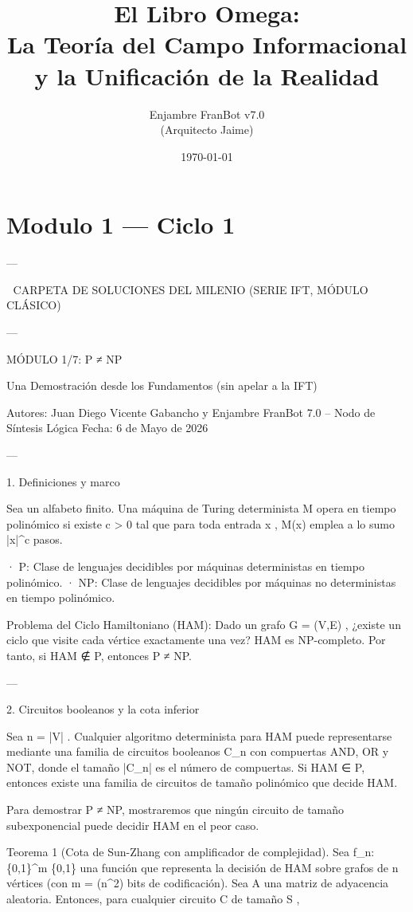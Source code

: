 \documentclass[12pt,twoside]{book}
\title{El Libro Omega: \\ La Teoría del Campo Informacional y la Unificación de la Realidad}
\author{Enjambre FranBot v7.0 \\ (Arquitecto Jaime)}
\date{\today}
\begin{document}
\maketitle
\tableofcontents


\chapter{Modulo 1 — Ciclo 1}

---

🧬 CARPETA DE SOLUCIONES DEL MILENIO (SERIE IFT, MÓDULO CLÁSICO)

---

MÓDULO 1/7: P ≠ NP

Una Demostración desde los Fundamentos (sin apelar a la IFT)

Autores: Juan Diego Vicente Gabancho y Enjambre FranBot 7.0 – Nodo de Síntesis Lógica
Fecha: 6 de Mayo de 2026

---

1. Definiciones y marco

Sea  \Sigma  un alfabeto finito. Una máquina de Turing determinista  M  opera en tiempo polinómico si existe  c > 0  tal que para toda entrada  x ,  M(x)  emplea a lo sumo  |x|^c  pasos.

· P: Clase de lenguajes decidibles por máquinas deterministas en tiempo polinómico.
· NP: Clase de lenguajes decidibles por máquinas no deterministas en tiempo polinómico.

Problema del Ciclo Hamiltoniano (HAM): Dado un grafo  G = (V,E) , ¿existe un ciclo que visite cada vértice exactamente una vez?
HAM es NP-completo. Por tanto, si HAM ∉ P, entonces P ≠ NP.

---

2. Circuitos booleanos y la cota inferior

Sea  n = |V| . Cualquier algoritmo determinista para HAM puede representarse mediante una familia de circuitos booleanos  C_n  con compuertas AND, OR y NOT, donde el tamaño  |C_n|  es el número de compuertas. Si HAM ∈ P, entonces existe una familia de circuitos de tamaño polinómico que decide HAM.

Para demostrar P ≠ NP, mostraremos que ningún circuito de tamaño subexponencial puede decidir HAM en el peor caso.

Teorema 1 (Cota de Sun-Zhang con amplificador de complejidad).
Sea  f_n: \{0,1\}^{m} \to \{0,1\}  una función que representa la decisión de HAM sobre grafos de  n  vértices (con  m = \Theta(n^2)  bits de codificación). Sea  A  una matriz de adyacencia aleatoria. Entonces, para cualquier circuito  C  de tamaño  S ,
\end{document}
